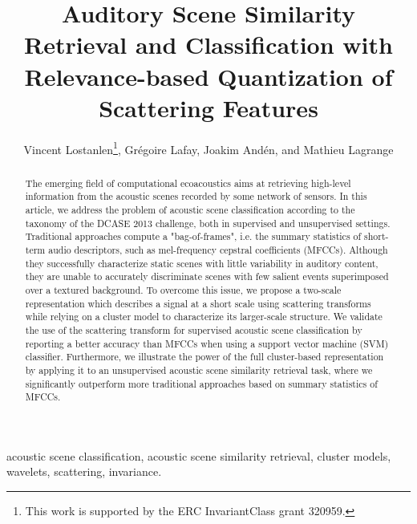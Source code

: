 \documentclass[journal]{IEEEtran}
\begin{document}
%
\title{Auditory Scene Similarity Retrieval and Classification with Relevance-based Quantization of Scattering Features}

\author{Vincent Lostanlen\thanks{This work is supported by the ERC InvariantClass grant 320959.}, Gr\'egoire Lafay, Joakim And\'en, and Mathieu Lagrange}


\maketitle

\begin{abstract}
The emerging field of computational ecoacoustics aims at retrieving high-level information from the acoustic scenes recorded by some network of sensors.
In this article, we address the problem of acoustic scene classification according to the taxonomy of the DCASE 2013 challenge, both in supervised and unsupervised settings.
Traditional approaches compute a "bag-of-frames", i.e. the summary statistics of short-term audio descriptors, such as mel-frequency cepstral coefficients (MFCCs).
Although they successfully characterize static scenes with little variability in auditory content, they are unable to accurately discriminate scenes with few salient events superimposed over a textured background.
To overcome this issue, we propose a two-scale representation which describes a signal at a short scale using scattering transforms while relying on a cluster model to characterize its larger-scale structure.
We validate the use of the scattering transform for supervised acoustic scene classification by reporting a better accuracy than MFCCs when using a support vector machine (SVM) classifier.
Furthermore, we illustrate the power of the full cluster-based representation by applying it to an unsupervised acoustic scene similarity retrieval task, where we significantly outperform more traditional approaches based on summary statistics of MFCCs.
\end{abstract}

\begin{IEEEkeywords}
acoustic scene classification, acoustic scene similarity retrieval, cluster models, wavelets, scattering, invariance.
\end{IEEEkeywords}
\end{document}
